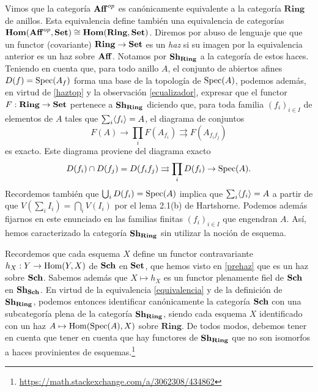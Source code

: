 \documentclass[twoside]{article}
\begin{document}
 
 Vimos que la categoría $\mathrm{\mathbf{Aff}}^{op}$ es canónicamente equivalente a la categoría $\mathrm{\mathbf{Ring}}$ de anillos. Esta equivalencia define también una equivalencia de categorías $\mathrm{\mathbf{Hom}}(\mathrm{\mathbf{Aff}}^{op},\mathrm{\mathbf{Set}})\cong \mathrm{\mathbf{Hom}}(\mathrm{\mathbf{Ring}},\mathrm{\mathbf{Set}})$. Diremos por abuso de lenguaje que que un functor (covariante) $\mathrm{\mathbf{Ring}}\to\mathrm{\mathbf{Set}}$ es un \emph{haz} si su imagen por la equivalencia anterior es un haz sobre $\mathrm{\mathbf{Aff}}$. Notamos por $\mathrm{\mathbf{Sh}}_{\mathrm{\mathbf{Ring}}}$ a la categoría de estos haces. Teniendo en cuenta que, para todo anillo $A$, el conjunto de abiertos afines $D(f)=\operatorname{Spec}(A_f)$ forma una base de la topología de $\operatorname{Spec}(A)$, podemos además, en virtud de \ref{haztop} y la observación \ref{ecualizador}, expresar que el functor $F:\mathrm{\mathbf{Ring}}\to\mathrm{\mathbf{Set}}$ pertenece a $\mathrm{\mathbf{Sh}}_{\mathrm{\mathbf{Ring}}}$ diciendo que, para toda familia $(f_i)_{i\in I}$ de elementos de $A$ tales que $\sum_i \langle{f_i}\rangle=A$, el diagrama de conjuntos
 \[F(A)\to\prod_i F(A_{f_i})\rightrightarrows F(A_{f_if_j})\]
es exacto. Este diagrama proviene del diagrama exacto
\[
D(f_i)\cap D(f_j)=D(f_if_j)\rightrightarrows \prod_i D(f_i)\to \operatorname{Spec}(A).
\] 
Recordemos también que $\bigcup_i D(f_i)=\operatorname{Spec}(A)$ implica que $\sum_i\langle{f_i}\rangle=A$ a partir de que $V(\sum_i I_i)=\bigcap_i V(I_i)$ por el lema 2.1(b) de Hartshorne. Podemos además fijarnos en este enunciado en las familias finitas $(f_i)_{i\in I}$ que engendran $A$. %
Así, hemos caracterizado la categoría $\mathrm{\mathbf{Sh}}_{\mathrm{\mathbf{Ring}}}$ sin utilizar la noción de esquema. 


Recordemos que cada esquema $X$ define un functor contravariante $h_X:Y\to\operatorname{Hom}(Y,X)$ de $\mathrm{\mathbf{Sch}}$ en $\mathrm{\mathbf{Set}}$, que hemos visto en \ref{prehaz} que es un haz sobre $\mathrm{\mathbf{Sch}}$. Sabemos además que $X\mapsto h_X$ es un functor plenamente fiel de $\mathrm{\mathbf{Sch}}$ en $\mathrm{\mathbf{Sh}}_{\mathrm{\mathbf{Sch}}}$. En virtud de la equivalencia \ref{equivalencia} y de la definición de $\mathrm{\mathbf{Sh}}_{\mathrm{\mathbf{Ring}}}$, podemos entonces identificar canónicamente la categoría $\mathrm{\mathbf{Sch}}$ con una subcategoría plena de la categoría $\mathrm{\mathbf{Sh}}_{\mathrm{\mathbf{Ring}}}$, siendo cada esquema $X$ identificado con un haz $A\mapsto \operatorname{Hom}(\operatorname{Spec}(A),X)$ sobre $\mathrm{\mathbf{Ring}}$. De todos modos, debemos tener en cuenta que tener en cuenta que hay functores de $\mathrm{\mathbf{Sh}}_{\mathrm{\mathbf{Ring}}}$ que no son isomorfos a haces provinientes de esquemas.\footnote{\url{https://math.stackexchange.com/a/3062308/434862}} %
 
\end{document}
